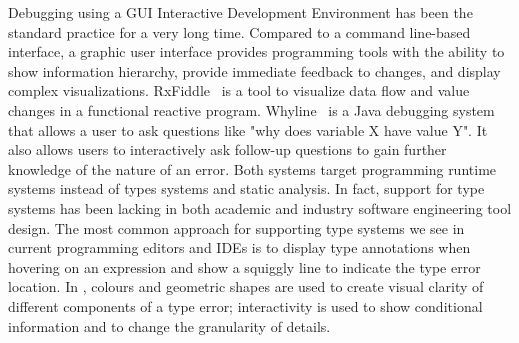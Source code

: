 Debugging using a GUI Interactive Development Environment has been the standard practice for a very long time. Compared to a command line-based interface, a graphic user interface provides programming tools with the ability to show information hierarchy, provide immediate feedback to changes, and display complex visualizations. RxFiddle~\cite{banken2018debugging} is a tool to visualize data flow and value changes in a functional reactive program. Whyline~\cite{ko2009finding} is a Java debugging system that allows a user to ask questions like "why does variable X have value Y". It also allows users to interactively ask follow-up questions to gain further knowledge of the nature of an error. Both  systems target programming runtime systems instead of types systems and static analysis. In fact, support for type systems has been lacking in both academic and industry software engineering tool design. The most common approach for supporting type systems we see in current programming editors and IDEs is to display type annotations when hovering on an expression and show a squiggly line to indicate the type error location. In \chameleon{}, colours and geometric shapes are used to create visual clarity of different components of a type error; interactivity is used to show conditional information and to change the granularity of details.


